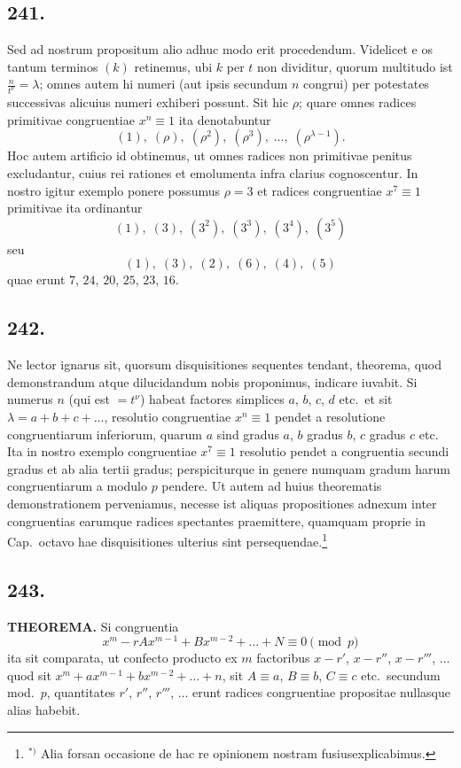 \documentclass[12pt,a4paper]{article}
\begin{document}
\subsection*{241.}

Sed ad nostrum propositum alio adhuc modo erit procedendum. Videlicet e os tantum terminos $(k)$ retinemus, ubi $k$ per $t$ non dividitur, quorum multitudo ist $\frac{n}{t^\nu}=\lambda$; omnes autem hi numeri (aut ipsis secundum $n$ congrui) per potestates successivas alicuius numeri exhiberi possunt. Sit hic $\rho$; quare omnes radices primitivae congruentiae $x^n\equiv 1$ ita denotabuntur
\[
(1),\; (\rho),\; (\rho^2),\; (\rho^3),\; \ldots,\; (\rho^{\lambda-1}).\tag{26}
\]
Hoc autem artificio id obtinemus, ut omnes radices non primitivae penitus excludantur, cuius rei rationes et emolumenta infra clarius cognoscentur. In nostro igitur exemplo ponere possumus $\rho=3$ et radices congruentiae $x^7\equiv 1$ primitivae ita ordinantur
\[
(1),\; (3),\; (3^2),\; (3^3),\; (3^4),\; (3^5)
\]
seu
\[
(1),\; (3),\; (2),\; (6),\; (4),\; (5)
\]
quae erunt $7$, $24$, $20$, $25$, $23$, $16$.

\subsection*{242.}

Ne lector ignarus sit, quorsum disquisitiones sequentes tendant, theorema, quod demonstrandum atque dilucidandum nobis proponimus, indicare iuvabit. Si numerus $n$ (qui est $=t^\nu$) habeat factores simplices $a$, $b$, $c$, $d$ etc.~et sit $\lambda=a+b+c+\ldots$, resolutio congruentiae $x^n\equiv 1$ pendet a resolutione congruentiarum inferiorum, quarum $a$ sind gradus $a$, $b$ gradus $b$, $c$ gradus $c$ etc. Ita in nostro exemplo congruentiae $x^7\equiv 1$ resolutio pendet a congruentia secundi gradus et ab alia tertii gradus; perspiciturque in genere numquam gradum harum congruentiarum a modulo $p$ pendere. Ut autem ad huius theorematis demonstrationem perveniamus, necesse ist aliquas propositiones adnexum inter congruentias earumque radices spectantes praemittere, quamquam proprie in Cap.~octavo hae disquisitiones ulterius sint persequendae.\footnote{$^{*)}$ Alia forsan occasione de hac re opinionem nostram fusiusexplicabimus.}

\subsection*{243.}

\textbf{THEOREMA.} Si congruentia
\[
x^m - rAx^{m-1} + Bx^{m-2} + \ldots + N \equiv 0 \pmod{p}
\]
ita sit comparata, ut confecto producto ex $m$ factoribus $x-r'$, $x-r''$, $x-r'''$, $\ldots$ quod sit $x^m+ax^{m-1}+bx^{m-2}+\ldots+n$, sit $A\equiv a$, $B\equiv b$, $C\equiv c$ etc.~secundum mod.~$p$, quantitates $r'$, $r''$, $r'''$, $\ldots$ erunt radices congruentiae propositae nullasque alias habebit.
\end{document}
